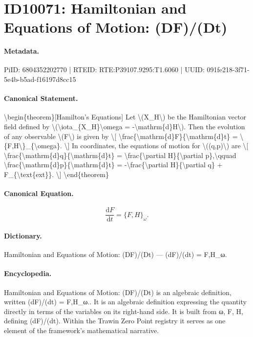 \section*{ID10071: Hamiltonian and Equations of Motion: (DF)/(Dt)}
\paragraph{Metadata.}
PiID: 6804352202770 | RTEID: RTE:P39107.9295:T1.6060 | UUID: 091fe218-3f71-5e4b-b5ad-f16197d8cc15

\paragraph{Canonical Statement.}
\textbackslash{}begin\{theorem\}[Hamilton’s Equations] Let \textbackslash{}(X\_H\textbackslash{}) be the Hamiltonian vector field defined by \textbackslash{}(\textbackslash{}iota\_\{X\_H\}\textbackslash{}omega = -\textbackslash{}mathrm\{d\}H\textbackslash{}). Then the evolution of any observable \textbackslash{}(F\textbackslash{}) is given by \textbackslash{}[ \textbackslash{}frac\{\textbackslash{}mathrm\{d\}F\}\{\textbackslash{}mathrm\{d\}t\} = \textbackslash{}\{F,H\textbackslash{}\}\_\{\textbackslash{}omega\}. \textbackslash{}] In coordinates, the equations of motion for \textbackslash{}((q,p)\textbackslash{}) are \textbackslash{}[ \textbackslash{}frac\{\textbackslash{}mathrm\{d\}q\}\{\textbackslash{}mathrm\{d\}t\} = \textbackslash{}frac\{\textbackslash{}partial H\}\{\textbackslash{}partial p\},\textbackslash{}qquad \textbackslash{}frac\{\textbackslash{}mathrm\{d\}p\}\{\textbackslash{}mathrm\{d\}t\} = -\textbackslash{}frac\{\textbackslash{}partial H\}\{\textbackslash{}partial q\} + F\_\{\textbackslash{}text\{ext\}\}. \textbackslash{}] \textbackslash{}end\{theorem\}

\paragraph{Canonical Equation.}
\[
\frac{\mathrm{d}F}{\mathrm{d}t} = \{F,H\}_{\omega}.
\]

\paragraph{Dictionary.}
Hamiltonian and Equations of Motion: (DF)/(Dt) — (dF)/(dt) = F,H\_ω.

\paragraph{Encyclopedia.}
Hamiltonian and Equations of Motion: (DF)/(Dt) is an algebraic definition, written (dF)/(dt) = F,H\_ω.. It is an algebraic definition expressing the quantity directly in terms of the variables on its right-hand side. It is built from ω, F, H, defining (dF)/(dt). Within the Trawin Zero Point registry it serves as one element of the framework's mathematical narrative.
